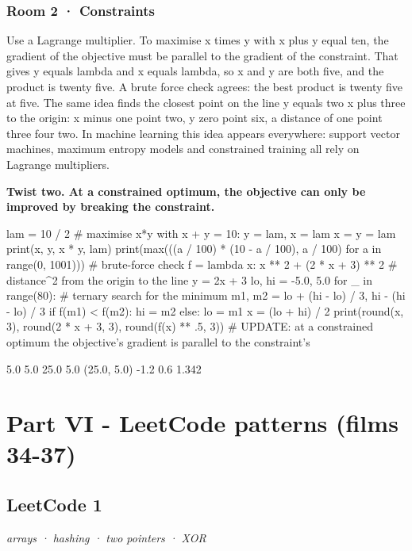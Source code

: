 \documentclass[11pt,a4paper]{report}
\begin{document}
\section*{Room 2 · Constraints}
Use a Lagrange multiplier. To maximise x times y with x plus y equal ten, the gradient of the objective must be parallel to the gradient of the constraint. That gives y equals lambda and x equals lambda, so x and y are both five, and the product is twenty five. A brute force check agrees: the best product is twenty five at five. The same idea finds the closest point on the line y equals two x plus three to the origin: x minus one point two, y zero point six, a distance of one point three four two. In machine learning this idea appears everywhere: support vector machines, maximum entropy models and constrained training all rely on Lagrange multipliers.
\begin{tcolorbox}[colback=yellow!12,colframe=orange!70!black,boxrule=0.4pt,left=4pt,right=4pt,top=2pt,bottom=2pt]\textbf{Twist two. At a constrained optimum, the objective can only be improved by breaking the constraint.}\end{tcolorbox}
\begin{Code}
lam = 10 / 2                                # maximise x*y with x + y = 10: y = lam, x = lam
x = y = lam
print(x, y, x * y, lam)
print(max(((a / 100) * (10 - a / 100), a / 100) for a in range(0, 1001)))     # brute-force check
f = lambda x: x ** 2 + (2 * x + 3) ** 2     # distance^2 from the origin to the line y = 2x + 3
lo, hi = -5.0, 5.0
for _ in range(80):                         # ternary search for the minimum
    m1, m2 = lo + (hi - lo) / 3, hi - (hi - lo) / 3
    if f(m1) < f(m2): hi = m2
    else: lo = m1
x = (lo + hi) / 2
print(round(x, 3), round(2 * x + 3, 3), round(f(x) ** .5, 3))
# UPDATE: at a constrained optimum the objective's gradient is parallel to the constraint's
\end{Code}
\begin{Out}
5.0 5.0 25.0 5.0
(25.0, 5.0)
-1.2 0.6 1.342
\end{Out}
\part*{Part VI - LeetCode patterns (films 34-37)}
\chapter{LeetCode 1}
\textit{arrays · hashing · two pointers · XOR}
\end{document}
